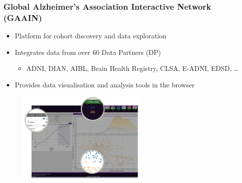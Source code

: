 \documentclass[10pt,xcolor=table]{beamer}
\begin{document}
\begin{frame}
\frametitle{Global Alzheimer's Association Interactive Network (GAAIN)}

\begin{itemize}
 \item Platform for cohort discovery and data exploration
 \item Integrates data from over 60 Data Partners (DP)
 \begin{itemize}
  \item ADNI, DIAN, AIBL, Brain Health Registry, CLSA,  E-ADNI, EDSD, \dots
 \end{itemize}
 \item Provides data visualisation and analysis tools in the browser
\end{itemize}

\begin{figure}
\centering
\includegraphics[height=4.5cm,right]{interrogator.png}   
\end{figure}

\end{frame}

% 
% 
% 
% 

\fontsize{6pt}{7.2}\selectfont
{}
\end{document}

